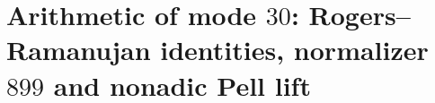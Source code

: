 \chapter{Arithmetic of mode \(30\): Rogers--Ramanujan identities, normalizer \(899\) and nonadic Pell lift}
\label{chap:p3-final:46:modo_30_pell}



